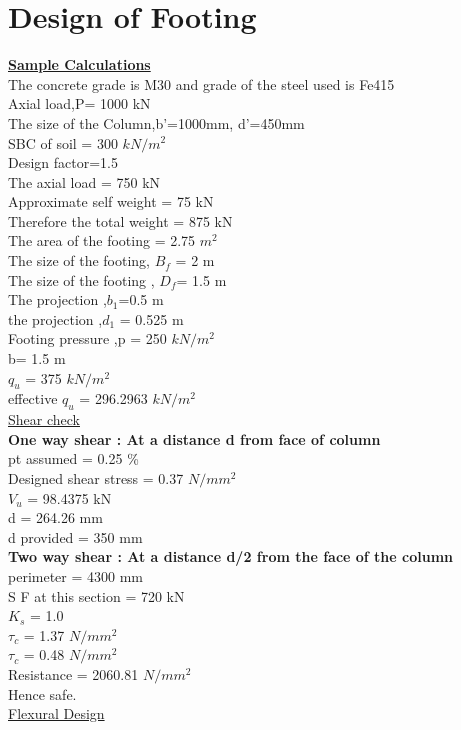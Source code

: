 \section{Design of Footing}
\textbf{\underline{Sample Calculations}}\\
The concrete grade is M30 and grade of the steel used is Fe415\\
Axial load,P= 1000 kN\\
The size of the Column,b'=1000mm, d'=450mm\\
SBC of soil = 300 $kN/m^{2}$\\
Design factor=1.5\\
The axial load = 750 kN\\
Approximate self weight = 75 kN\\
Therefore the total weight = 875 kN\\
The area of the footing = 2.75 $m^2$\\
The size of the footing, $B_f$ = 2 m\\
The size of the footing , $D_f$= 1.5 m\\
The projection ,$b_1$=0.5 m\\
the projection ,$d_1$ = 0.525 m\\
Footing pressure ,p = 250 $kN/m^{2}$\\
b= 1.5 m\\
$q_u$ = 375 $kN/m^{2}$\\
effective $q_u$ = 296.2963 $kN/m^{2}$\\
\underline{Shear check}\\
\textbf{One way shear : At a distance d from face of column}\\
pt assumed = 0.25 \% \\
Designed shear stress = 0.37 $N/mm^2$ \\
$V_u$ = 98.4375 kN\\
d = 264.26 mm\\
d provided = 350 mm\\
\textbf{Two way shear : At a distance d/2 from the face of the column} \\
perimeter = 4300 mm\\
S F at this section = 720 kN \\
$K_s$ = 1.0 \\
$\tau_c$ = 1.37 $N/mm^2$\\
$\tau_c$ = 0.48 $N/mm^2$\\
Resistance = 2060.81 $N/mm^2$\\
 Hence safe.
 \\ \underline{Flexural Design}\\
 	
